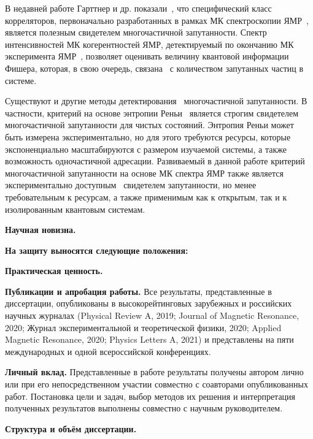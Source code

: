 В недавней работе Гарттнер и др. показали~\cite{Garttner2018},
что специфический класс корреляторов,
первоначально разработанных в рамках МК спектроскопии ЯМР~\cite{Baum1985},
является полезным свидетелем многочастичной запутанности.
Спектр интенсивностей МК когерентностей ЯМР,
детектируемый по окончанию МК эксперимента ЯМР~\cite{Baum1985},
позволяет оценивать величину квантовой информации Фишера,
которая, в свою очередь, связана~\cite{Toth2014} с количеством запутанных частиц в системе.

Существуют и другие методы детектирования~\cite{Guhne2009} многочастичной запутанности.
В частности, критерий на основе энтропии Реньи~\cite{Hosur2016, Fan2017}
является строгим свидетелем многочастичной запутанности для чистых состояний.
Энтропия Реньи может быть измерена экспериментально,
но для этого требуются ресурсы,
которые экспоненциально масштабируются с размером изучаемой системы,
а также возможность одночастичной адресации.
Развиваемый в данной работе критерий многочастичной запутанности на основе МК спектра ЯМР
также является экспериментально доступным~\cite{Baum1985} свидетелем запутанности,
но менее требовательным к ресурсам,
а также применимым как к открытым,
так и к изолированным квантовым системам.





\textbf{Научная новизна.}


\textbf{На защиту выносятся следующие положения:}



\textbf{Практическая ценность.}


\textbf{Публикации и апробация работы.}
Все результаты, представленные в диссертации,
опубликованы в высокорейтинговых зарубежных и российских научных журналах (Physical Review A, 2019;  Journal of Magnetic Resonance, 2020; Журнал экспериментальной и теоретической физики, 2020; Applied Magnetic Resonance, 2020;  Physics Letters A, 2021) и представлены на пяти международных и одной всероссийской конференциях.

\textbf{Личный вклад.}
Представленные в работе результаты получены автором лично или при его непосредственном участии совместно с соавторами опубликованных работ. Постановка цели и задач, выбор методов их решения и интерпретация полученных результатов выполнены совместно с научным руководителем.

\textbf{Структура и объём диссертации.}


